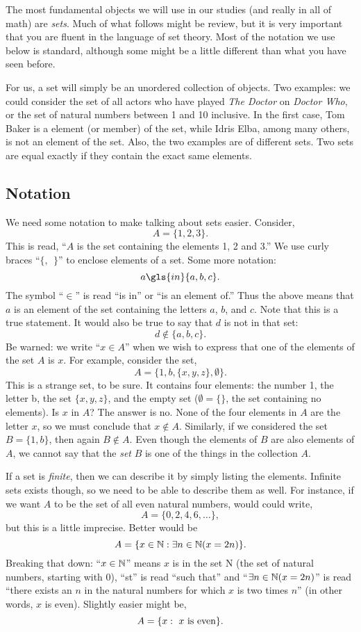 \documentclass[12pt]{article}
\begin{document}
The most fundamental objects we will use in our studies (and really in all of math) are \textit{sets}.  Much of what follows might be review, but it is very important that you are fluent in the language of set theory.  Most of the notation we use below is standard, although some might be a little different than what you have seen before.

For us, a set will simply be an unordered collection of objects.  Two examples: we could consider the set of all actors who have played \textit{The Doctor} on \textit{Doctor Who}, or the set of natural numbers between 1 and 10 inclusive.  In the first case, Tom Baker is a element (or member) of the set, while Idris Elba, among many others, is not an element of the set.  Also, the two examples are of different sets.  Two sets are equal exactly if they contain the exact same elements.



\subsection{Notation}

We need some notation to make talking about sets easier.  Consider,
\[ A = \{1, 2, 3\}.\]
This is read, ``$A$ is the set containing the elements 1, 2 and 3.''  We use curly braces ``$\{,~~ \}$'' to enclose elements of a set.  Some more notation:
\[ a \gls{in} \{a, b, c\}. \]
The symbol ``$\in$'' is read ``is in'' or ``is an element of.''  Thus the above means that $a$ is an element of the set containing the letters $a$, $b$, and $c$.  Note that this is a true statement.  It would also be true to say that $d$ is not in that set:
\[ d \not\in \{a, b, c\}.\]
Be warned: we write ``$x \in A$'' when we wish to express that one of the elements of the set $A$ is $x$.  For example, consider the set,
\[A = \{1, b, \{x, y, z\}, \emptyset\}.\]
This is a strange set, to be sure. It contains four elements: the number 1, the letter b, the set $\{x,y,z\}$, and the empty set ($\emptyset = \{ \}$, the set containing no elements).  Is $x$ in $A$?  The answer is no.  None of the four elements in $A$ are the letter $x$, so we must conclude that $x \notin A$.  Similarly, if we considered the set $B = \{1,b\}$, then again $B \notin A$.  Even though the elements of $B$ are also elements of $A$, we cannot say that the \emph{set} $B$ is one of the things in the collection $A$.

If a set is \emph{finite}, then we can describe it by simply listing the elements.  Infinite sets exists though, so we need to be able to describe them as well.  For instance, if we want $A$ to be the set of all even natural numbers, would could write,
\[ A = \{0, 2, 4, 6, \ldots\},\]
but this is a little imprecise.  Better would be
\[ A = \{x \in \mathbb N : \exists n\in \mathbb N ( x = 2 n)\}.\]
Breaking that down: ``$x \in \mathbb N$'' means $x$ is in the set \gls{N} (the set of natural numbers, starting with 0), ``\gls{st}'' is read ``such that'' and ``$\exists n\in \mathbb N (x = 2n)$'' is read ``there exists an $n$ in the natural numbers for which $x$ is two times $n$'' (in other words, $x$ is even).  Slightly easier might be,
\[ A = \{x : \mbox{ $x$ is even}\}. \]
\end{document}
